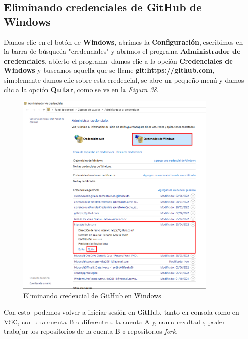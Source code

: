 \subsection{Eliminando credenciales de GitHub de Windows}
\hspace{0.55cm}Damos clic en el botón de \textbf{Windows}, abrimos la \textbf{Configuración}, escribimos en la barra de búsqueda "credenciales" y abrimos el programa \textbf{Administrador de credenciales}, abierto el programa, damos clic a la opción \textbf{Credenciales de Windows} y buscamos aquella que se llame \textbf{git:https://github.com}, simplemente damos clic sobre esta credencial, se abre un pequeño menú y damos clic a la opción \textbf{Quitar}, como se ve en la \textit{Figura 38}.
\begin{figure}[H]
    \begin{center}
        \caption{Eliminando credencial de GitHub en Windows}
        \label{fig: 38}
        \includegraphics[width=10cm]{capturas/credencial.png}
    \end{center}
\end{figure}

Con esto, podemos volver a iniciar sesión en GitHub, tanto en consola como en VSC, con una cuenta B o diferente a la cuenta A y, como resultado, poder trabajar los repositorios de la cuenta B o repositorios \textit{fork}.